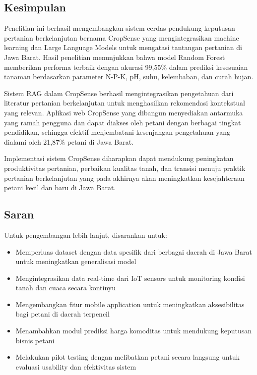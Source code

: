 \documentclass{article} %
\begin{document}
\subsection{Kesimpulan}

Penelitian ini berhasil mengembangkan sistem cerdas pendukung keputusan pertanian berkelanjutan bernama CropSense yang mengintegrasikan machine learning dan Large Language Models untuk mengatasi tantangan pertanian di Jawa Barat. Hasil penelitian menunjukkan bahwa model Random Forest memberikan performa terbaik dengan akurasi 99,55\% dalam prediksi kesesuaian tanaman berdasarkan parameter N-P-K, pH, suhu, kelembaban, dan curah hujan.

Sistem RAG dalam CropSense berhasil mengintegrasikan pengetahuan dari literatur pertanian berkelanjutan untuk menghasilkan rekomendasi kontekstual yang relevan. Aplikasi web CropSense yang dibangun menyediakan antarmuka yang ramah pengguna dan dapat diakses oleh petani dengan berbagai tingkat pendidikan, sehingga efektif menjembatani kesenjangan pengetahuan yang dialami oleh 21,87\% petani di Jawa Barat.

Implementasi sistem CropSense diharapkan dapat mendukung peningkatan produktivitas pertanian, perbaikan kualitas tanah, dan transisi menuju praktik pertanian berkelanjutan yang pada akhirnya akan meningkatkan kesejahteraan petani kecil dan baru di Jawa Barat.

\subsection{Saran}

Untuk pengembangan lebih lanjut, disarankan untuk:

\begin{itemize}
    \item Memperluas dataset dengan data spesifik dari berbagai daerah di Jawa Barat untuk meningkatkan generalisasi model
    \item Mengintegrasikan data real-time dari IoT sensors untuk monitoring kondisi tanah dan cuaca secara kontinyu
    \item Mengembangkan fitur mobile application untuk meningkatkan aksesibilitas bagi petani di daerah terpencil
    \item Menambahkan modul prediksi harga komoditas untuk mendukung keputusan bisnis petani
    \item Melakukan pilot testing dengan melibatkan petani secara langsung untuk evaluasi usability dan efektivitas sistem
\end{itemize}
\end{document}
